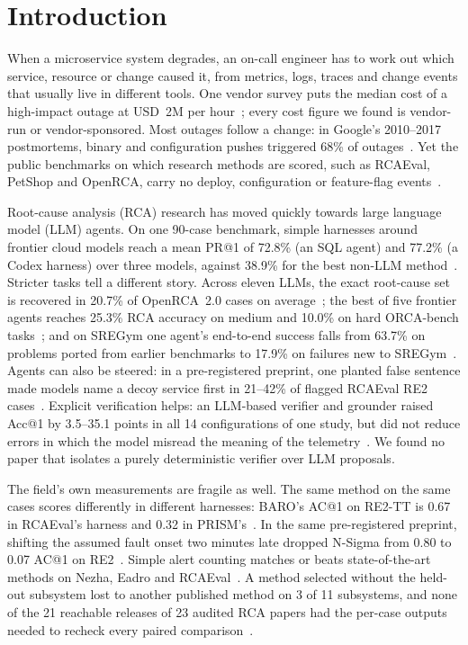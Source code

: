 \section{Introduction}
\label{sec:intro}

When a microservice system degrades, an on-call engineer has to work out which service, resource or change caused it, from metrics, logs, traces and change events that usually live in different tools.
One vendor survey puts the median cost of a high-impact outage at USD~2M per hour~\cite{newrelic2025forecast}; every cost figure we found is vendor-run or vendor-sponsored.
Most outages follow a change: in Google's 2010--2017 postmortems, binary and configuration pushes triggered 68\% of outages~\cite{googlesre2017postmortem}.
Yet the public benchmarks on which research methods are scored, such as RCAEval, PetShop and OpenRCA, carry no deploy, configuration or feature-flag events~\cite{rcaeval2024,petshop2024,openrca2025}.

Root-cause analysis (RCA) research has moved quickly towards large language model (LLM) agents.
On one 90-case benchmark, simple harnesses around frontier cloud models reach a mean PR@1 of 72.8\% (an SQL agent) and 77.2\% (a Codex harness) over three models, against 38.9\% for the best non-LLM method~\cite{rcatlas2026}.
Stricter tasks tell a different story.
Across eleven LLMs, the exact root-cause set is recovered in 20.7\% of OpenRCA~2.0 cases on average~\cite{openrca2026v2}; the best of five frontier agents reaches 25.3\% RCA accuracy on medium and 10.0\% on hard ORCA-bench tasks~\cite{orcabench2026}; and on SREGym one agent's end-to-end success falls from 63.7\% on problems ported from earlier benchmarks to 17.9\% on failures new to SREGym~\cite{sregym2026}.
Agents can also be steered: in a pre-registered preprint, one planted false sentence made models name a decoy service first in 21--42\% of flagged RCAEval RE2 cases~\cite{hussain2026prereg}.
Explicit verification helps: an LLM-based verifier and grounder raised Acc@1 by 3.5--35.1 points in all 14 configurations of one study, but did not reduce errors in which the model misread the meaning of the telemetry~\cite{diagguard2026}.
We found no paper that isolates a purely deterministic verifier over LLM proposals.

The field's own measurements are fragile as well.
The same method on the same cases scores differently in different harnesses: BARO's AC@1 on RE2-TT is 0.67 in RCAEval's harness and 0.32 in PRISM's~\cite{rcaeval2024,prism2026}.
In the same pre-registered preprint, shifting the assumed fault onset two minutes late dropped N-Sigma from 0.80 to 0.07 AC@1 on RE2~\cite{hussain2026prereg}.
Simple alert counting matches or beats state-of-the-art methods on Nezha, Eadro and RCAEval~\cite{fang2026rethinking}.
A method selected without the held-out subsystem lost to another published method on 3 of 11 subsystems, and none of the 21 reachable releases of 23 audited RCA papers had the per-case outputs needed to recheck every paired comparison~\cite{hu2026audit}.

